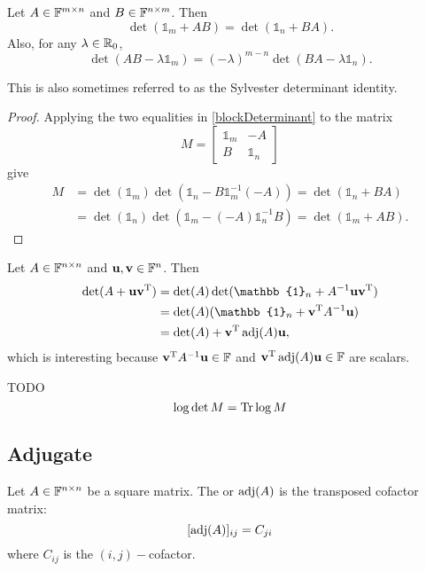 \begin{lemma}
Let $A\in\mathbb{F}^{m\times n}$ and $B\in\mathbb{F}^{n\times m}$. Then
\[ \det(\mathbb{1}_{m} + AB) = \det(\mathbb{1}_{n} + BA). \]
Also, for any $\lambda\in\mathbb{R}_0$,
\[ \det(AB - \lambda\mathbb{1}_{m}) = (-\lambda)^{m-n}\det(BA - \lambda\mathbb{1}_{n}). \]
\end{lemma}
This is also sometimes referred to as the Sylvester determinant identity.
\begin{proof}
Applying the two equalities in \ref{blockDeterminant} to the matrix
\[ M = \begin{bmatrix}
\mathbb{1}_m & -A \\
B & \mathbb{1}_n
\end{bmatrix} \]
give
\begin{align*}
M &= \det(\mathbb{1}_m)\det(\mathbb{1}_n - B\mathbb{1}_m^{-1}(-A)) = \det(\mathbb{1}_n+BA) \\
&= \det(\mathbb{1}_n)\det(\mathbb{1}_m - (-A)\mathbb{1}_n^{-1}B) = \det(\mathbb{1}_m+AB).
\end{align*}
\end{proof}
\begin{corollary}
Let $A\in\mathbb{F}^{n\times n}$ and $\boldsymbol{\mathrm{u}},\boldsymbol{\mathrm{v}}\in\mathbb{F}^n$. Then
\begin{align*}
\det(A+\vec{u}\vec{v}^\transp) &= \det(A)\det(\mathbb{1}_n + A^{-1}\vec{u}\vec{v}^\transp) \\
&= \det(A)(\mathbb{1}_n + \vec{v}^\transp A^{-1}\vec{u}) \\
&= \det(A) + \vec{v}^\transp \adj(A)\vec{u},
\end{align*}
which is interesting because $\boldsymbol{\mathrm{v}}^{\mathrm{T}} A^{-1}\boldsymbol{\mathrm{u}} \in\mathbb{F}$  and $\boldsymbol{\mathrm{v}}^{\mathrm{T}} \operatorname{adj}(A)\boldsymbol{\mathrm{u}}\in\mathbb{F}$ are scalars.
\end{corollary}

TODO
\[ \log\det M=\operatorname{Tr}\log M \]


\subsection{Adjugate}
\begin{definition}
Let $A\in\mathbb{F}^{n\times n}$ be a square matrix. The  or  $\operatorname{adj}(A)$ is the transposed cofactor matrix:
\[ [\operatorname{adj}(A)]_{ij} = C_{ji} \]
where $C_{ij}$ is the $(i,j)-$cofactor.
\end{definition}

